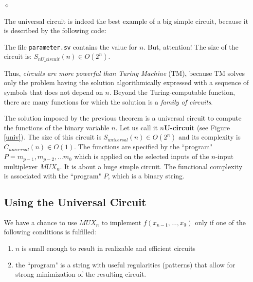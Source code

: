 $\diamond$

The universal circuit is indeed the best example of a big simple
circuit, because it is described by the following code:

The file {\tt parameter.sv} contains the value for $n$. But,
attention! The size of the circuit is: $S_{nU\_circuit}(n) \in
O(2^{n})$.

Thus, {\em circuits are more powerful than Turing Machine} (TM),
because TM solves only the problem having the solution algorithmically
expressed with a sequence of symbols that does not depend on $n$.
Beyond the Turing-computable function, there are many functions for
which the solution is a {\em family of circuits}.

The solution imposed by the previous theorem is a universal
circuit to compute the functions of the binary variable $n$. Let us
call it $n${\bf U-circuit} (see Figure \ref{univ}). The size of
this circuit is $S_{universal} (n) \in O(2^{n})$ and its
complexity is $C_{universal}(n) \in O(1)$. The functions are
specified by the ``program" $P = m_{p-1}, m_{p-2}, \ldots m_{0}$
which is applied on the selected inputs of the $n$-input
multiplexer $MUX_{n}$. It is about a huge simple circuit. The
functional complexity is associated with the ``program" $P$, which
is a binary string.


\subsection{Using the Universal Circuit}

We have a chance to use $MUX_{n}$ to implement $f(x_{n-1}, \ldots
, x_{0})$ only if one of the following conditions is fulfilled:
\begin{enumerate}
    \item $n$ is small enough to result in realizable and efficient
    circuits
    \item the ``program" is a string with useful regularities
    (patterns) that allow for strong minimization of the resulting circuit.
\end{enumerate}

